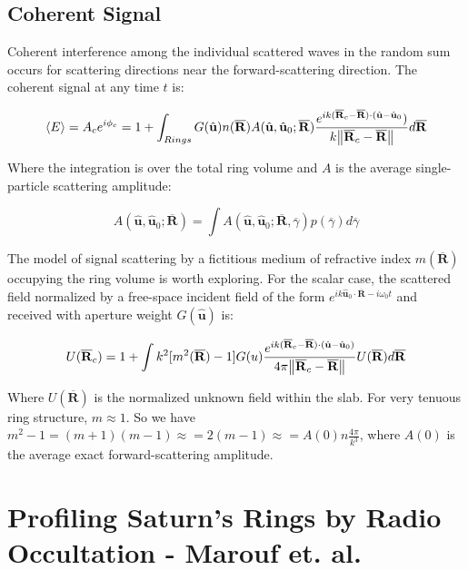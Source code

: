 \documentclass{article}
\theoremstyle{mystyle}
\begin{document}
\subsection{Coherent Signal}

Coherent interference among the individual scattered waves in the random sum occurs for scattering directions near the forward-scattering direction. The coherent signal at any time $t$ is:

\begin{equation}
\langle E \rangle = A_{c}e^{i\phi_{c}} = 1+\int_{Rings}G(\hat{\mathbf{u}})n(\overline{\mathbf{R}})A(\hat{\mathbf{u}},\hat{\mathbf{u}}_{0};\overline{\mathbf{R}})\frac{e^{ik(\overline{\mathbf{R}}_{c}-\overline{\mathbf{R}})\cdot(\hat{\mathbf{u}}-\hat{\mathbf{u}}_{0}})}{k\norm{\overline{\mathbf{R}}_{c}-\overline{\mathbf{R}}}}d\overline{\mathbf{R}}
\end{equation}

Where the integration is over the total ring volume and $A$ is the average single-particle scattering amplitude:

\begin{equation}
A(\hat{\mathbf{u}},\hat{\mathbf{u}}_{0};\overline{\mathbf{R}}) = \int A(\hat{\mathbf{u}},\hat{\mathbf{u}}_{0};\overline{\mathbf{R}},\overline{\gamma})p(\overline{\gamma})d\overline{\gamma}
\end{equation}

The model of signal scattering by a fictitious medium of refractive index $m(\overline{\mathbf{R}})$ occupying the ring volume is worth exploring. For the scalar case, the scattered field normalized by a free-space incident field of the form $e^{ik\hat{\mathbf{u}}_{0}\cdot \overline{\mathbf{R}}-i\omega_{0}t}$ and received with aperture weight $G(\hat{\mathbf{u}})$ is:

\begin{equation}
U(\overline{\mathbf{R}}_{c}) = 1+\int k^2[m^2(\overline{\mathbf{R}}) - 1]G(u)\frac{e^{ik(\overline{\mathbf{R}}_{c}-\overline{\mathbf{R}})\cdot(\hat{\mathbf{u}}-\hat{\mathbf{u}}_{0})}}{4\pi \norm{\overline{\mathbf{R}}_{c}-\overline{\mathbf{R}}}}U(\overline{\mathbf{R}})d\overline{\mathbf{R}}
\end{equation}

Where $U(\overline{\mathbf{R}})$ is the normalized unknown field within the slab. For very tenuous ring structure, $m\approx 1$. So we have $m^2-1 = (m+1)(m-1) \approx = 2(m-1) \approx = A(0)n\frac{4\pi}{k^3}$, where $A(0)$ is the average exact forward-scattering amplitude. 
%
\section{Profiling Saturn's Rings by Radio Occultation - Marouf et. al.}
\end{document}
